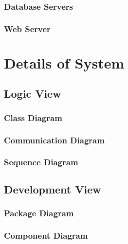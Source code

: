 \documentclass[12pt]{article}
\begin{document}
	\subsubsection{Database Servers}



	\subsubsection{Web Server}



\section{Details of System}

	\subsection {Logic View}

	\subsubsection{Class Diagram}



	\subsubsection{Communication Diagram}



	\subsubsection {Sequence Diagram}



	\subsection{Development View}



	\subsubsection{Package Diagram}



	\subsubsection{Component Diagram}
\end{document}
